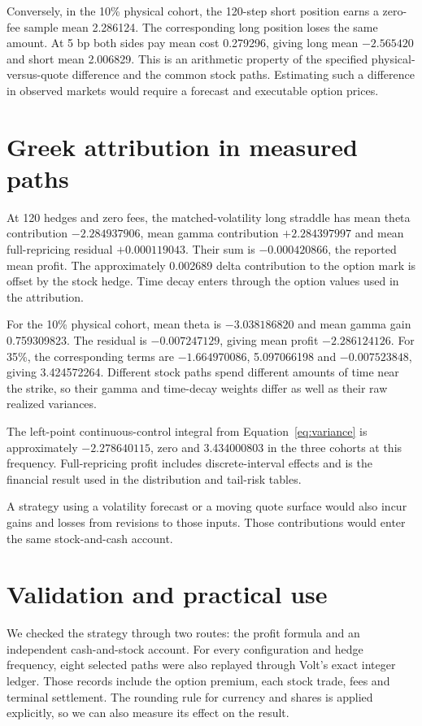 \documentclass[8pt]{strategynet-journal}
\begin{document}
\begin{SNcolumns}
Conversely, in the 10\% physical cohort, the 120-step short position earns a
zero-fee sample mean 2.286124. The corresponding long position loses the same
amount. At 5 bp both sides pay mean cost 0.279296, giving long mean $-2.565420$
and short mean 2.006829. This is an arithmetic property of the specified
physical-versus-quote difference and the common stock paths. Estimating such a
difference in observed markets would require a forecast and executable option
prices.

\section{Greek attribution in measured paths}
At 120 hedges and zero fees, the matched-volatility long straddle has mean
theta contribution $-2.284937906$, mean gamma contribution $+2.284397997$ and
mean full-repricing residual $+0.000119043$. Their sum is $-0.000420866$, the
reported mean profit. The approximately 0.002689 delta contribution to the
option mark is offset by the stock hedge. Time decay enters through the option values used in the attribution.

For the 10\% physical cohort, mean theta is $-3.038186820$ and mean gamma gain
0.759309823. The residual is $-0.007247129$, giving mean profit $-2.286124126$.
For 35\%, the corresponding terms are $-1.664970086$, 5.097066198 and
$-0.007523848$, giving 3.424572264. Different stock paths spend different amounts
of time near the strike, so their gamma and time-decay weights differ as well
as their raw realized variances.

The left-point continuous-control integral from Equation~\eqref{eq:variance}
is approximately $-2.278640115$, zero and 3.434000803 in the three cohorts at
this frequency. Full-repricing
profit includes discrete-interval effects and is the financial result used in
the distribution and tail-risk tables.

A strategy
using a volatility forecast or a moving quote surface would also incur gains
and losses from revisions to those inputs. Those contributions would enter
the same stock-and-cash account.

\section{Validation and practical use}
We checked the strategy through two routes: the profit formula and an
independent cash-and-stock account. For every configuration and hedge frequency,
eight selected paths were also replayed through Volt's exact integer ledger.
Those records include the option premium, each stock trade, fees and terminal
settlement. The rounding rule for currency and shares is applied explicitly,
so we can also measure its effect on the result.


\end{SNcolumns}
\end{document}
